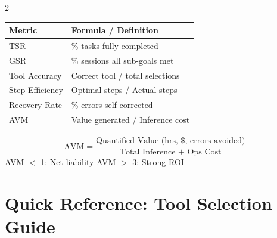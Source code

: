\documentclass[12pt, letterpaper]{article}
\begin{document}
\begin{multicols}{2}
\columnbreak

\begin{tcolorbox}[perfbox, title={Agentic Task Performance}]
    \begin{tabular}{@{}p{2.4cm}p{4cm}@{}}
        \textbf{Metric} & \textbf{Formula / Definition} \\
        \midrule
        TSR & \% tasks fully completed \\
        GSR & \% sessions all sub-goals met \\
        Tool Accuracy & Correct tool / total selections \\
        Step Efficiency & Optimal steps / Actual steps \\
        Recovery Rate & \% errors self-corrected \\
        AVM & Value generated / Inference cost \\
    \end{tabular}
\end{tcolorbox}

\vspace{0.3cm}

\begin{tcolorbox}[notebox, title={AVM Formula}]
\[
    \text{AVM} = \frac{\text{Quantified Value (hrs, \$, errors avoided)}}{\text{Total Inference + Ops Cost}}
\]
    AVM $<$ 1: Net liability \quad AVM $>$ 3: Strong ROI
\end{tcolorbox}

\end{multicols}

\section{Quick Reference: Tool Selection Guide}
\end{document}
